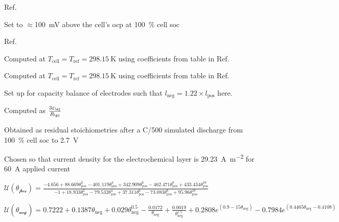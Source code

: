 \begin{table}[!htbp]
\begin{threeparttable}
        \begin{tablenotes}
        \item[a] Ref.~\cite{Northrop2011}
        \item[b] Set to $\approx $\SI{100}{\milli\volt} above the cell's \gls{ocp} at \SI{100}{\percent} cell \gls{soc}
        \item[c] Ref.~\cite{Subramanian2009}
        \item[d] Computed at $T_\text{cell} = T_\text{ref} = \SI{298.15}{\kelvin}$ using coefficients from table  in Ref.~\cite{Valoen2005} \\
        \item[e] Computed at $T_\text{cell} = T_\text{ref} = \SI{298.15}{\kelvin}$ using coefficients from table  in Ref.~\cite{Valoen2005}\\
        \item[f] Set up for capacity balance of electrodes such that $l_\text{neg} = 1.22 \times l_\text{pos}$ here.
        \item[g] Computed as $\frac{3 \varepsilon_\sj}{R_\pj}$\\
        \item[h] Obtained as residual stoichiometries after a C/\num{500} simulated discharge from \SI{100}{\percent} cell \gls{soc} to \SI{2.7}{V}
        \item[i] Chosen so that current density for the electrochemical layer is \SI{29.23}{\ampere\per\meter\squared} for \SI{60}{\ampere} applied current
        \item[k] $ \mathcal{U(\theta_\text{pos})} = \displaystyle \frac{-4.656 + 88.669\theta_\text{pos}^2 - 401.119\theta_\text{pos}^4 + 342.909\theta_\text{pos}^6 - 462.471\theta_\text{pos}^8 + 433.434\theta_\text{pos}^{10}}{-1 + 18.933\theta_\text{pos}^2 - 79.532\theta_\text{pos}^4 + 37.311\theta_\text{pos}^6 - 73.083\theta_\text{pos}^8 + 95.96\theta_\text{pos}^{10}}$ \\[0.25em]
        \item[m] $\mathcal{U(\theta_\text{neg})} = 0.7222 + 0.1387\theta_\text{neg} + 0.029\theta_\text{neg}^{0.5} - \frac{0.0172}{\theta_\text{neg}} + \frac{0.0019}{\theta_\text{neg}^{1.5}} + 0.2808 e^{(0.9 - 15\theta_\text{neg})} - 0.7984 e^{(0.4465\theta_\text{neg} - 0.4108)}$\vfill
        \end{tablenotes}

    \end{threeparttable}
\end{table}


